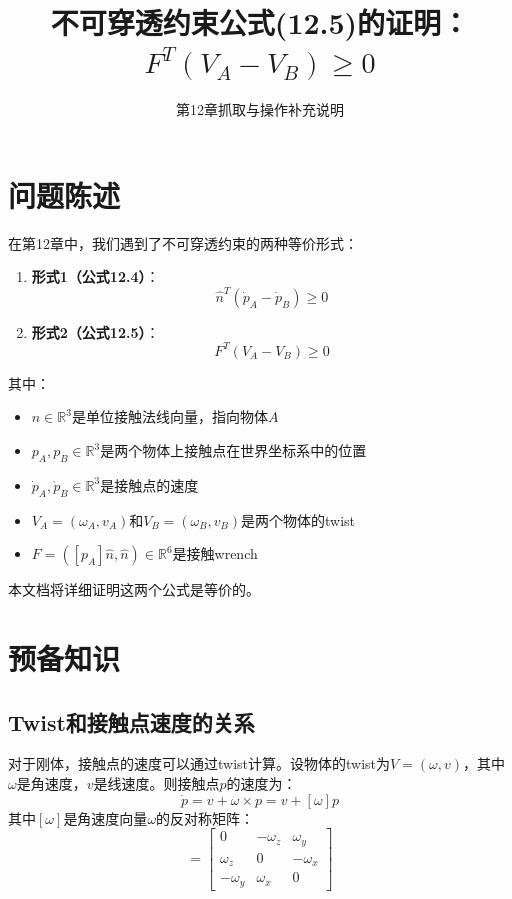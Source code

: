\documentclass[12pt,a4paper]{article}
\title{不可穿透约束公式(12.5)的证明：$F^T (V_A - V_B) \geq 0$}
\author{第12章抓取与操作补充说明}
\date{}
\begin{document}
\maketitle

\section{问题陈述}

在第12章中，我们遇到了不可穿透约束的两种等价形式：

\begin{enumerate}
\item \textbf{形式1（公式12.4）}：
\begin{equation}
\hat{n}^T (\dot{p}_A - \dot{p}_B) \geq 0
\label{eq:12.4}
\end{equation}

\item \textbf{形式2（公式12.5）}：
\begin{equation}
F^T (V_A - V_B) \geq 0
\label{eq:12.5}
\end{equation}
\end{enumerate}

其中：
\begin{itemize}
\item $\hat{n} \in \mathbb{R}^3$是单位接触法线向量，指向物体$A$
\item $p_A, p_B \in \mathbb{R}^3$是两个物体上接触点在世界坐标系中的位置
\item $\dot{p}_A, \dot{p}_B \in \mathbb{R}^3$是接触点的速度
\item $V_A = (\omega_A, v_A)$和$V_B = (\omega_B, v_B)$是两个物体的twist
\item $F = ([p_A]\hat{n}, \hat{n}) \in \mathbb{R}^6$是接触wrench
\end{itemize}

本文档将详细证明这两个公式是等价的。

\section{预备知识}

\subsection{Twist和接触点速度的关系}

对于刚体，接触点的速度可以通过twist计算。设物体的twist为$V = (\omega, v)$，其中$\omega$是角速度，$v$是线速度。则接触点$p$的速度为：
\begin{equation}
\dot{p} = v + \omega \times p = v + [\omega] p
\label{eq:contact_velocity}
\end{equation}
其中$[\omega]$是角速度向量$\omega$的反对称矩阵：
\begin{equation}
[\omega] = \begin{bmatrix}
0 & -\omega_z & \omega_y \\
\omega_z & 0 & -\omega_x \\
-\omega_y & \omega_x & 0
\end{bmatrix}
\end{equation}
\end{document}
